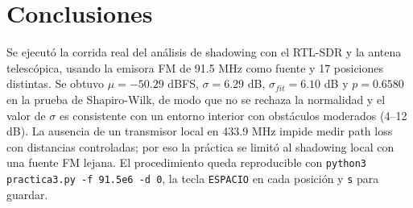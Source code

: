 \documentclass[11pt,a4paper]{article}
\begin{document}
\section{Conclusiones}

Se ejecutó la corrida real del análisis de shadowing con el RTL-SDR y la antena telescópica, usando la emisora FM de 91.5 MHz como fuente y 17 posiciones distintas. Se obtuvo $\mu = -50.29$ dBFS, $\sigma = 6.29$ dB, $\sigma_{fit} = 6.10$ dB y $p = 0.6580$ en la prueba de Shapiro-Wilk, de modo que no se rechaza la normalidad y el valor de $\sigma$ es consistente con un entorno interior con obstáculos moderados (4--12 dB). La ausencia de un transmisor local en 433.9 MHz impide medir path loss con distancias controladas; por eso la práctica se limitó al shadowing local con una fuente FM lejana. El procedimiento queda reproducible con \texttt{python3 practica3.py -f 91.5e6 -d 0}, la tecla \texttt{ESPACIO} en cada posición y \texttt{s} para guardar.
\end{document}
